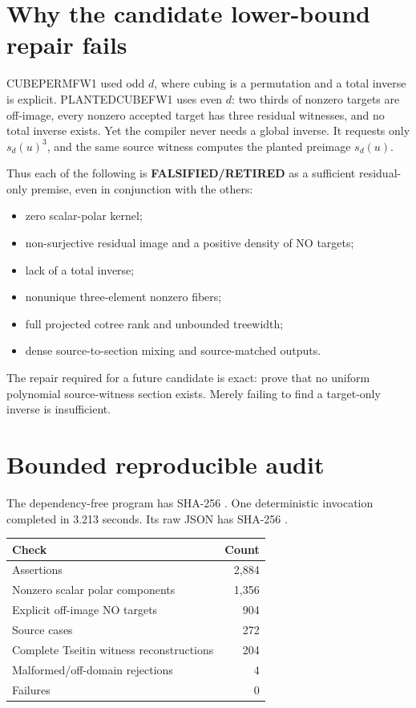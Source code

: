 \documentclass[11pt]{article}
\newcommand{\RET}{\textbf{FALSIFIED/RETIRED}}
\begin{document}
\section{Why the candidate lower-bound repair fails}
CUBEPERMFW1 used odd $d$, where cubing is a permutation and a total inverse is
explicit.  PLANTEDCUBEFW1 uses even $d$: two thirds of nonzero targets are
off-image, every nonzero accepted target has three residual witnesses, and no
total inverse exists.  Yet the compiler never needs a global inverse.  It
requests only $s_d(u)^3$, and the same source witness computes the planted
preimage $s_d(u)$.

Thus each of the following is \RET{} as a sufficient residual-only premise,
even in conjunction with the others:
\begin{itemize}
\item zero scalar-polar kernel;
\item non-surjective residual image and a positive density of NO targets;
\item lack of a total inverse;
\item nonunique three-element nonzero fibers;
\item full projected cotree rank and unbounded treewidth;
\item dense source-to-section mixing and source-matched outputs.
\end{itemize}
The repair required for a future candidate is exact: prove that no uniform
polynomial source-witness section exists.  Merely failing to find a
target-only inverse is insufficient.

\section{Bounded reproducible audit}
The dependency-free program
 has SHA-256
.
One deterministic invocation completed in 3.213 seconds.  Its raw JSON
has SHA-256
.

\begin{center}
\begin{tabular}{lr}
\toprule
Check & Count \\
\midrule
Assertions & 2,884 \\
Nonzero scalar polar components & 1,356 \\
Explicit off-image NO targets & 904 \\
Source cases & 272 \\
Complete Tseitin witness reconstructions & 204 \\
Malformed/off-domain rejections & 4 \\
Failures & 0 \\
\bottomrule
\end{tabular}
\end{center}
\end{document}
